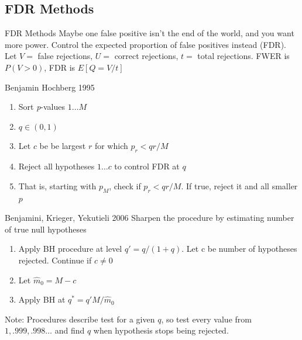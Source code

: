 \documentclass{beamer}
\begin{document}
\subsection{FDR Methods}
\begin{frame}{FDR Methods}
Maybe one false positive isn't the end of the world, and you want more power. Control the expected proportion of false positives instead (FDR).
\vskip0.1in
Let $V=$ false rejections, $U=$ correct rejections, $t=$ total rejections.
\vskip0.1in
FWER is $P(V>0)$, FDR is $E[Q=V/t]$
\end{frame}

\begin{frame}{Benjamin Hochberg 1995}
\begin{enumerate}
\item Sort \textit{p}-values $1 \ldots M$
\item $q \in (0,1)$
\item Let $c$ be be largest $r$ for which $p_r<qr/M$
\item Reject all hypotheses $1 \ldots c$ to control FDR at $q$
\item That is, starting with $p_M$, check if $p_r<qr/M$. If true, reject it and all smaller $p$

\end{enumerate}
\end{frame}

\begin{frame}{Benjamini, Krieger, Yekutieli 2006}
Sharpen the procedure by estimating number of true null hypotheses
\begin{enumerate}
\item Apply BH  procedure at level $q'=q/(1+q)$. Let c be number of hypotheses rejected. Continue if $c\neq0$
\item Let $\hat{m}_0=M-c$
\item Apply BH at $q^*=q'M/\hat{m}_0$
\end{enumerate}
\vskip0.1in
Note: Procedures describe test for a given $q$, so test every value from $1, .999, .998 \ldots$ and find $q$ when hypothesis stops being rejected.
\end{frame}
\end{document}
